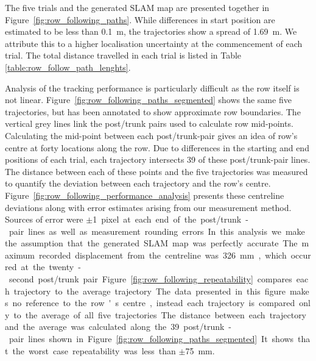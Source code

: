 \documentclass[preprint,authoryear,12pt]{elsarticle}
\begin{document}
    The five trials and the generated SLAM map are presented together in Figure~\ref{fig:row_following_paths}.
    While differences in start position are estimated to be less than \SI{0.1}{\meter}, the trajectories show a spread of \SI{1.69}{\meter}.
    We attribute this to a higher localisation uncertainty at the commencement of each trial.
    The total distance travelled in each trial is listed in Table \ref{table:row_follow_path_lenghts}.

    Analysis of the tracking performance is particularly difficult as the row itself is not linear.
    Figure~\ref{fig:row_following_paths_segmented} shows the same five trajectories, but has been annotated to show approximate row boundaries.
    The vertical grey lines link the post/trunk pairs used to calculate row mid-points.
    Calculating the mid-point between each post/trunk-pair gives an idea of row's centre at forty locations along the row.
    Due to differences in the starting and end positions of each trial, each trajectory intersects 39 of these post/trunk-pair lines.
    The distance between each of these points and the five trajectories was measured to quantify the deviation between each trajectory and the row's centre.
    Figure~\ref{fig:row_following_performance_analysis} presents these centreline deviations along with error estimates arising from our measurement method.
    Sources of error were $\pm$\SI{1} pixel at each end of the post/trunk-pair lines as well as measurement rounding errors.
    In this analysis we make the assumption that the generated SLAM map was perfectly accurate.
    The maximum recorded displacement from the centreline was \SI{326}{\milli\meter}, which occurred at the twenty-second post/trunk pair.

    Figure~\ref{fig:row_following_repeatability} compares each trajectory to the average trajectory.
    The data presented in this figure makes no reference to the row's centre, instead each trajectory is compared only to the average of all five trajectories.
    The distance between each trajectory and the average was calculated along the 39 post/trunk-pair lines shown in Figure~\ref{fig:row_following_paths_segmented}.
    It shows that the worst case repeatability was less than $\pm$\SI{75}{\milli\meter}.
\end{document}
